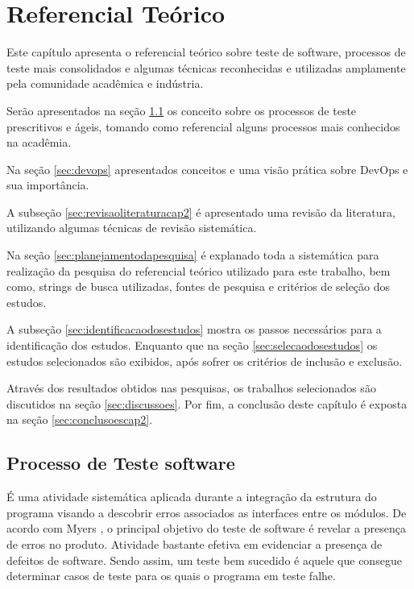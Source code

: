 \chapter{Referencial Teórico}
\label{sec:referencialteorico}

Este capítulo apresenta o referencial teórico sobre teste de software, processos de teste mais consolidados e algumas técnicas reconhecidas e utilizadas amplamente pela comunidade acadêmica e indústria.

Serão apresentados na seção \ref{sec:processotestedesoftware} os conceito sobre os processos de teste prescritivos e ágeis, tomando como referencial alguns processos mais conhecidos na acadêmia.

Na seção \ref{sec:devops} apresentados conceitos e uma visão prática sobre DevOps e sua importância.

A subseção \ref{sec:revisaoliteraturacap2} é apresentado uma revisão da literatura, utilizando algumas técnicas de revisão sistemática.

Na seção \ref{sec:planejamentodapesquisa} é explanado toda a sistemática para realização da pesquisa do referencial teórico utilizado para este trabalho, bem como, strings de busca utilizadas, fontes de pesquisa e critérios de seleção dos estudos.

A subseção \ref{sec:identificacaodosestudos} mostra os passos necessários para a identificação dos estudos. Enquanto que na seção \ref{sec:selecaodosestudos} os estudos selecionados são exibidos, após sofrer os critérios de inclusão e exclusão.

Através dos resultados obtidos nas pesquisas, os trabalhos selecionados são discutidos na seção \ref{sec:discussoes}. Por fim, a conclusão deste capítulo é exposta na seção \ref{sec:conclusoescap2}.


\section{Processo de Teste software}
\label{sec:processotestedesoftware}

É uma atividade sistemática aplicada durante a integração da estrutura do programa visando a descobrir erros associados as interfaces entre os módulos. De acordo com Myers \cite{myers2004}, o principal objetivo do teste de software é revelar a presença de erros no produto. Atividade bastante efetiva em evidenciar a presença de defeitos de software. Sendo assim, um teste bem sucedido é aquele que consegue determinar casos de teste para os quais o programa em teste falhe.


